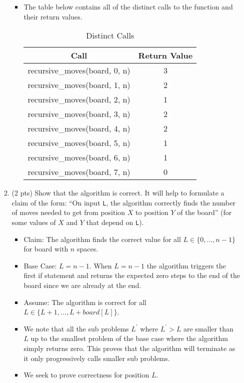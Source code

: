 \documentclass[letterpaper,11pt]{article}
\begin{document}
\begin{enumerate}
\begin{enumerate}
  \begin{itemize}
      \color{teal}
      \item The table below contains all of the distinct calls to the function
          and their return values. 

          \begin{table}[htpb]
              \color{teal}
              \centering
              \caption{Distinct Calls}
              \label{tab:DistinctCalls}
              \begin{tabular}{c | c}
              Call  & Return Value \\  
              \hline
              recursive\_moves(board, 0, n) & 3 \\ 
              recursive\_moves(board, 1, n) & 2 \\ 
              recursive\_moves(board, 2, n) & 1 \\ 
              recursive\_moves(board, 3, n) & 2 \\ 
              recursive\_moves(board, 4, n) & 2 \\ 
              recursive\_moves(board, 5, n) & 1 \\ 
              recursive\_moves(board, 6, n) & 1 \\ 
              recursive\_moves(board, 7, n) & 0 \\ 
              \end{tabular}
          \end{table}
  \end{itemize}
  

  \item (2 pts) Show that the algorithm is correct. It will help to formulate
    a claim of the form: ``On input \texttt{L}, the algorithm correctly finds
    the number of moves needed to get from position $X$ to position
    $Y$ of the board'' (for some values of $X$ and $Y$ that depend on \texttt{L}).
    \begin{itemize}
        \color{teal}
    \item Claim: The algorithm finds the correct value for all 
        $L  \in \{0, \ldots, n-1\} $ for board with $n$ spaces.
    \item Base Case: $L = n - 1$. When $L = n - 1$ the algorithm triggers the 
        first if statement and returns the expected zero steps to the end
        of the board since we are already at the end. 
    \item Assume: The algorithm is correct for all  
        $L \in \{L+1, \ldots, L+board[L]\} $.
    \item We note that all the sub problems  $L^{\prime}$ where 
    $L^{\prime} > L$ are smaller than $L$ up to the smallest problem of the
        base case where the algorithm simply returns zero. This proves that 
        the algorithm will terminate as it only progressively calls smaller 
        sub problems.
    \item We seek to prove correctness for position $L$.\\


\end{itemize}
\end{enumerate}
\end{enumerate}
\end{document}
